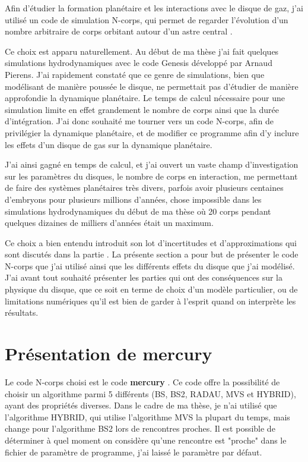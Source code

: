Afin d'étudier la formation planétaire et les interactions avec le disque de gaz, j'ai utilisé un code de simulation N-corps, qui permet de regarder l'évolution d'un nombre arbitraire de corps orbitant autour d'un astre central \citep{chambers1999hybrid}. 

Ce choix est apparu naturellement. Au début de ma thèse j'ai fait quelques simulations hydrodynamiques avec le code Genesis développé par Arnaud Pierens. J'ai rapidement constaté que ce genre de simulations, bien que modélisant de manière poussée le disque, ne permettait pas d'étudier de manière approfondie la dynamique planétaire. Le temps de calcul nécessaire pour une simulation limite en effet grandement le nombre de corps ainsi que la durée d'intégration. J'ai donc souhaité me tourner vers un code N-corps, afin de privilégier la dynamique planétaire, et de modifier ce programme afin d'y inclure les effets d'un disque de gas sur la dynamique planétaire. 

J'ai ainsi gagné en temps de calcul, et j'ai ouvert un vaste champ d'investigation sur les paramètres du disques, le nombre de corps en interaction, me permettant de faire des systèmes planétaires très divers, parfois avoir plusieurs centaines d'embryons pour plusieurs millions d'années, chose impossible dans les simulations hydrodynamiques du début de ma thèse où 20 corps pendant quelques dizaines de milliers d'années était un maximum. 

Ce choix a bien entendu introduit son lot d'incertitudes et d'approximations qui sont discutés dans la partie . La présente section a pour but de présenter le code N-corps que j'ai utilisé ainsi que les différents effets du disque que j'ai modélisé. J'ai avant tout souhaité présenter les parties qui ont des conséquences sur la physique du disque, que ce soit en terme de choix d'un modèle particulier, ou de limitations numériques qu'il est bien de garder à l'esprit quand on interprète les résultats.

\section{Présentation de mercury}
Le code N-corps choisi est le code \textbf{mercury} \citep{chambers1999hybrid}. Ce code offre la possibilité de choisir un algorithme parmi 5 différents (BS, BS2, RADAU, MVS et HYBRID), ayant des propriétés diverses. Dans le cadre de ma thèse, je n'ai utilisé que l'algorithme HYBRID, qui utilise l'algorithme MVS la plupart du temps, mais change pour l'algorithme BS2 lors de rencontres proches. Il est possible de déterminer à quel moment on considère qu'une rencontre est "proche" dans le fichier de paramètre de programme, j'ai laissé le paramètre par défaut. 

